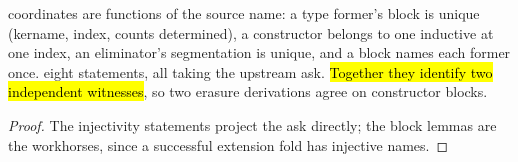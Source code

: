 \begin{lemma}
\label{lem:IndInfo-inj}
\leanok
{} \lbox{} coordinates are functions of the source name: a type former's block is
unique (kername, index, counts determined), a constructor belongs to one inductive at one index,
an eliminator's segmentation is unique, and a block names each former once.
 eight statements, all taking the upstream ask. \hl{Together they identify two
independent witnesses}, so two erasure derivations agree on constructor blocks.
\end{lemma}
\begin{proof}
\leanok
{}
 The injectivity statements project the ask directly; the block lemmas are the
workhorses, since a successful extension fold has injective names.
\end{proof}

